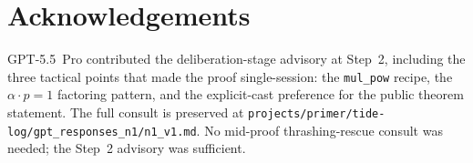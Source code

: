 \documentclass[11pt]{article}
\begin{document}
\section*{Acknowledgements}

GPT-5.5~Pro contributed the deliberation-stage advisory at Step~2,
including the three tactical points that made the proof
single-session: the \texttt{mul\_pow} recipe, the
$\alpha \cdot p = 1$ factoring pattern, and the explicit-cast
preference for the public theorem statement. The full consult is
preserved at
\texttt{projects/primer/tide-log/gpt\_responses\_n1/n1\_v1.md}. No
mid-proof thrashing-rescue consult was needed; the Step~2 advisory
was sufficient.
\end{document}
